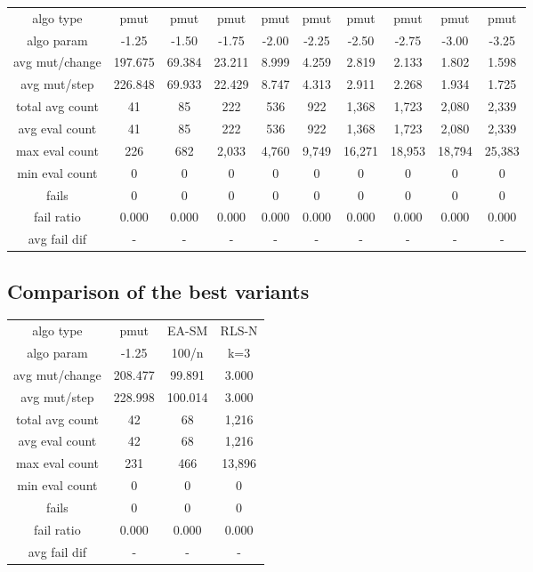 \begin{tabular}[h]{cccccccccc}
algo type&           pmut&    pmut&    pmut&    pmut&    pmut&    pmut&    pmut&    pmut&    pmut\\
algo param&         -1.25&   -1.50&   -1.75&   -2.00&   -2.25&   -2.50&   -2.75&   -3.00&   -3.25\\
avg mut/change&   197.675&  69.384&  23.211&   8.999&   4.259&   2.819&   2.133&   1.802&   1.598\\
avg mut/step&     226.848&  69.933&  22.429&   8.747&   4.313&   2.911&   2.268&   1.934&   1.725\\
\hline
total avg count&       41&      85&     222&     536&     922&   1,368&   1,723&   2,080&   2,339\\
avg eval count&        41&      85&     222&     536&     922&   1,368&   1,723&   2,080&   2,339\\
max eval count&       226&     682&   2,033&   4,760&   9,749&  16,271&  18,953&  18,794&  25,383\\
min eval count&         0&       0&       0&       0&       0&       0&       0&       0&       0\\
\hline
fails&                  0&       0&       0&       0&       0&       0&       0&       0&       0\\
fail ratio&         0.000&   0.000&   0.000&   0.000&   0.000&   0.000&   0.000&   0.000&   0.000\\
avg fail dif&           -&       -&       -&       -&       -&       -&       -&       -&       -\\
\end{tabular}


\subsection{Comparison of the best variants}


\begin{tabular}[h]{cccc}
algo type&           pmut&   EA-SM&   RLS-N\\
algo param&         -1.25&   100/n&     k=3\\
avg mut/change&   208.477&  99.891&   3.000\\
avg mut/step&     228.998& 100.014&   3.000\\
\hline
total avg count&       42&      68&   1,216\\
avg eval count&        42&      68&   1,216\\
max eval count&       231&     466&  13,896\\
min eval count&         0&       0&       0\\
\hline
fails&                  0&       0&       0\\
fail ratio&         0.000&   0.000&   0.000\\
avg fail dif&           -&       -&       -\\
\end{tabular}

